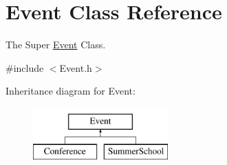 \hypertarget{classEvent}{}\section{Event Class Reference}
\label{classEvent}


The Super \hyperlink{classEvent}{Event} Class.  




{\ttfamily \#include $<$Event.\+h$>$}

Inheritance diagram for Event\+:\begin{figure}[H]
\begin{center}
\leavevmode
\includegraphics[height=2.000000cm]{classEvent}
\end{center}
\end{figure}
